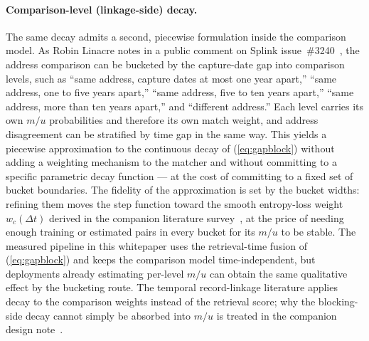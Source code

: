 \documentclass[11pt]{article}
\begin{document}
\paragraph{Comparison-level (linkage-side) decay.}
The same decay admits a second, piecewise formulation inside the comparison model. As Robin Linacre notes in a public comment on Splink issue~\#3240~\cite{linacrepc2026}, the address comparison can be bucketed by the capture-date gap into comparison levels, such as ``same address, capture dates at most one year apart,'' ``same address, one to five years apart,'' ``same address, five to ten years apart,'' ``same address, more than ten years apart,'' and ``different address.'' Each level carries its own $m/u$ probabilities and therefore its own match weight, and address disagreement can be stratified by time gap in the same way. This yields a piecewise approximation to the continuous decay of (\ref{eq:gapblock}) without adding a weighting mechanism to the matcher and without committing to a specific parametric decay function --- at the cost of committing to a fixed set of bucket boundaries. The fidelity of the approximation is set by the bucket widths: refining them moves the step function toward the smooth entropy-loss weight $w_c(\Delta t)$ derived in the companion literature survey~\cite{decaylitreview}, at the price of needing enough training or estimated pairs in every bucket for its $m/u$ to be stable. The measured pipeline in this whitepaper uses the retrieval-time fusion of (\ref{eq:gapblock}) and keeps the comparison model time-independent, but deployments already estimating per-level $m/u$ can obtain the same qualitative effect by the bucketing route. The temporal record-linkage literature applies decay to the comparison weights instead of the retrieval score; why the blocking-side decay cannot simply be absorbed into $m/u$ is treated in the companion design note~\cite{linacrepc2026}.
\end{document}
